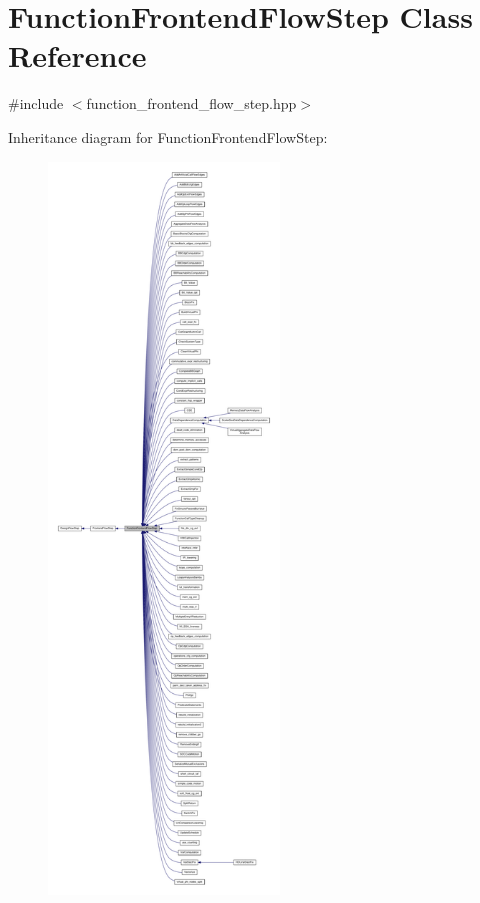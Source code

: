 \hypertarget{classFunctionFrontendFlowStep}{}\section{Function\+Frontend\+Flow\+Step Class Reference}
\label{classFunctionFrontendFlowStep}


{\ttfamily \#include $<$function\+\_\+frontend\+\_\+flow\+\_\+step.\+hpp$>$}



Inheritance diagram for Function\+Frontend\+Flow\+Step\+:
\nopagebreak
\begin{figure}[H]
\begin{center}
\leavevmode
\includegraphics[height=550pt]{df/dff/classFunctionFrontendFlowStep__inherit__graph}
\end{center}
\end{figure}


